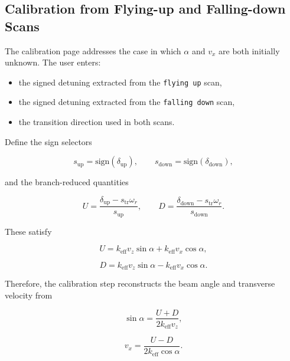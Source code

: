 \documentclass[11pt,a4paper]{article}
\begin{document}
\subsection{Calibration from Flying-up and Falling-down Scans}

The calibration page addresses the case in which $\alpha$ and $v_x$ are both initially unknown.
The user enters:

\begin{itemize}
  \item the signed detuning extracted from the \texttt{flying up} scan,
  \item the signed detuning extracted from the \texttt{falling down} scan,
  \item the transition direction used in both scans.
\end{itemize}

Define the sign selectors

\begin{equation}
s_{\mathrm{up}} = \mathrm{sign}(\delta_{\mathrm{up}}), \qquad
s_{\mathrm{down}} = \mathrm{sign}(\delta_{\mathrm{down}}),
\end{equation}

and the branch-reduced quantities

\begin{equation}
U = \frac{\delta_{\mathrm{up}} - s_{\mathrm{tr}}\omega_r}{s_{\mathrm{up}}}, \qquad
D = \frac{\delta_{\mathrm{down}} - s_{\mathrm{tr}}\omega_r}{s_{\mathrm{down}}}.
\end{equation}

These satisfy

\begin{equation}
U = k_{\mathrm{eff}}v_z\sin\alpha + k_{\mathrm{eff}}v_x\cos\alpha,
\end{equation}

\begin{equation}
D = k_{\mathrm{eff}}v_z\sin\alpha - k_{\mathrm{eff}}v_x\cos\alpha.
\end{equation}

Therefore, the calibration step reconstructs the beam angle and transverse velocity from

\begin{equation}
\sin\alpha = \frac{U + D}{2k_{\mathrm{eff}}v_z},
\end{equation}

\begin{equation}
v_x = \frac{U - D}{2k_{\mathrm{eff}}\cos\alpha}.
\end{equation}
\end{document}

